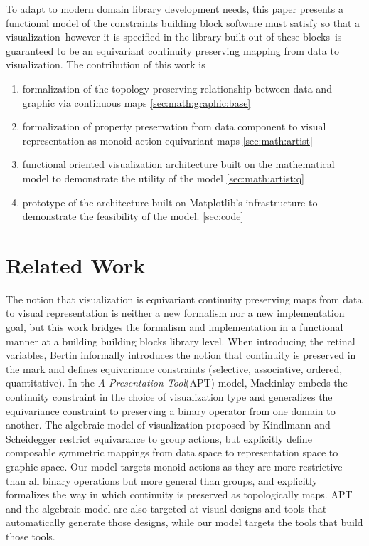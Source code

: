 \documentclass[journal]{vgtc}                %
\begin{document}
To adapt to modern domain library development needs, this paper presents a functional model of the constraints building block software must satisfy so that a visualization--however it is specified in the library built out of these blocks--is guaranteed to be an equivariant continuity preserving mapping from data to visualization. The contribution of this work is 
\begin{enumerate}
  \item formalization of the topology preserving relationship between data and graphic via continuous maps \autoref{sec:math:graphic:base}
  \item formalization of property preservation from data component to visual representation as monoid action equivariant maps \autoref{sec:math:artist}
  \item functional oriented visualization architecture built on the mathematical model to demonstrate the utility of the model \autoref{sec:math:artist:q}
  \item prototype of the architecture built on Matplotlib's infrastructure to demonstrate the feasibility of the model. \autoref{sec:code}
\end{enumerate}

\section{Related Work}
The notion that visualization is equivariant continuity preserving maps from data to visual representation is neither a new formalism nor a new implementation goal, but this work bridges the formalism and implementation in a functional manner at a building building blocks library level. When introducing the retinal variables, Bertin informally introduces the notion that continuity is preserved in the mark and  defines equivariance constraints (selective, associative, ordered, quantitative)\cite{bertinSemiologyGraphicsDiagrams2011a}. In the \textit{A Presentation Tool}(APT) model, Mackinlay embeds the continuity constraint in the choice of visualization type and generalizes the equivariance constraint to preserving a binary operator from one domain to another. The algebraic model of visualization proposed by Kindlmann and Scheidegger restrict equivarance to group actions, but explicitly define composable symmetric mappings from data space to representation space to graphic space. Our model targets monoid actions as they are more restrictive than all binary operations but more general than groups, and explicitly formalizes the way in which continuity is preserved as topologically maps. APT and the algebraic model are also targeted at visual designs and tools that automatically generate those designs, while our model targets the tools that build those tools. 
\end{document}
